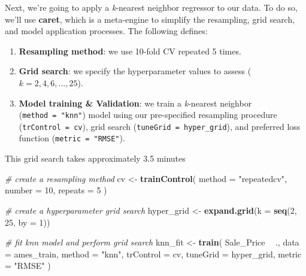 \documentclass[]{krantz}
\makeatletter
\newenvironment{Shaded}{\begin{snugshade}}{\end{snugshade}}
\newcommand{\CommentTok}[1]{\textcolor[rgb]{0.37,0.37,0.37}{\textit{#1}}}
\newcommand{\DataTypeTok}[1]{\textcolor[rgb]{0.27,0.27,0.27}{#1}}
\newcommand{\DecValTok}[1]{\textcolor[rgb]{0.06,0.06,0.06}{#1}}
\newcommand{\KeywordTok}[1]{\textcolor[rgb]{0.27,0.27,0.27}{\textbf{#1}}}
\newcommand{\NormalTok}[1]{#1}
\newcommand{\OperatorTok}[1]{\textcolor[rgb]{0.43,0.43,0.43}{\textbf{#1}}}
\newcommand{\StringTok}[1]{\textcolor[rgb]{0.5,0.5,0.5}{#1}}
\providecommand{\tightlist}{%
  \setlength{\itemsep}{0pt}\setlength{\parskip}{0pt}}
\newenvironment{kframe}{%
\medskip{}
\setlength{\fboxsep}{.8em}
 \def\at@end@of@kframe{}%
 \ifinner\ifhmode%
  \def\at@end@of@kframe{\end{minipage}}%
  \begin{minipage}{\columnwidth}%
 \fi\fi%
 \def\FrameCommand##1{\hskip\@totalleftmargin \hskip-\fboxsep
 \colorbox{shadecolor}{##1}\hskip-\fboxsep
     \hskip-\linewidth \hskip-\@totalleftmargin \hskip\columnwidth}%
 \MakeFramed {\advance\hsize-\width
   \@totalleftmargin\z@ \linewidth\hsize
   \@setminipage}}%
 {\par\unskip\endMakeFramed%
 \at@end@of@kframe}
\newenvironment{block}[1]
  {
  \begin{itemize}
  \renewcommand{\labelitemi}{
    \raisebox{-.7\height}[0pt][0pt]{
      {\setkeys{Gin}{width=3em,keepaspectratio}\texttt{[image: icons/\#1]}}
    }
  }
  \setlength{\fboxsep}{1em}
  \begin{kframe}
  \item
  }
  {
  \end{kframe}
  \end{itemize}
  }
\newenvironment{warning}
  {\begin{block}{warning}}
  {\end{block}}
\renewenvironment{Shaded}{\begin{kframe}}{\end{kframe}}
\makeatother
\begin{document}
Next, we're going to apply a \emph{k}-nearest neighbor regressor to our data. To do so, we'll use \textbf{caret}, which is a meta-engine to simplify the resampling, grid search, and model application processes. The following defines:

\begin{enumerate}
\def\labelenumi{\arabic{enumi}.}
\tightlist
\item
  \textbf{Resampling method}: we use 10-fold CV repeated 5 times.
\item
  \textbf{Grid search}: we specify the hyperparameter values to assess (\(k = 2, 4, 6, \dots, 25\)).
\item
  \textbf{Model training \& Validation}: we train a \emph{k}-nearest neighbor (\texttt{method\ =\ "knn"}) model using our pre-specified resampling procedure (\texttt{trControl\ =\ cv}), grid search (\texttt{tuneGrid\ =\ hyper\_grid}), and preferred loss function (\texttt{metric\ =\ "RMSE"}).
\end{enumerate}

\begin{warning}
This grid search takes approximately 3.5 minutes
\end{warning}

\begin{Shaded}
\begin{Highlighting}[]
\CommentTok{# create a resampling method}
\NormalTok{cv <-}\StringTok{ }\KeywordTok{trainControl}\NormalTok{(}
  \DataTypeTok{method =} \StringTok{"repeatedcv"}\NormalTok{, }
  \DataTypeTok{number =} \DecValTok{10}\NormalTok{, }
  \DataTypeTok{repeats =} \DecValTok{5}
\NormalTok{  )}

\CommentTok{# create a hyperparameter grid search}
\NormalTok{hyper_grid <-}\StringTok{ }\KeywordTok{expand.grid}\NormalTok{(}\DataTypeTok{k =} \KeywordTok{seq}\NormalTok{(}\DecValTok{2}\NormalTok{, }\DecValTok{25}\NormalTok{, }\DataTypeTok{by =} \DecValTok{1}\NormalTok{))}

\CommentTok{# fit knn model and perform grid search}
\NormalTok{knn_fit <-}\StringTok{ }\KeywordTok{train}\NormalTok{(}
\NormalTok{  Sale_Price }\OperatorTok{~}\StringTok{ }\NormalTok{., }
  \DataTypeTok{data =}\NormalTok{ ames_train, }
  \DataTypeTok{method =} \StringTok{"knn"}\NormalTok{, }
  \DataTypeTok{trControl =}\NormalTok{ cv, }
  \DataTypeTok{tuneGrid =}\NormalTok{ hyper_grid,}
  \DataTypeTok{metric =} \StringTok{"RMSE"}
\NormalTok{  )}
\end{Highlighting}
\end{Shaded}
\end{document}
